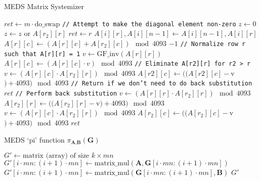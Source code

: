 \begin{algorithm}
  \caption{MEDS Matrix Systemizer}
  \label{alg:systemizer}
  \begin{algorithmic}
      \State $ret \gets m \cdot \text{do\_swap}$
        \State \texttt{// Attempt to make the diagonal element non-zero}
          \State $z \gets 0$
            \State $z \gets z$ or $A[r_2][r]$
          \EndFor
            \State $ret \gets r$
              \State $A[i][r], A[i][n-1] \gets A[i][n-1], A[i][r]$
            \EndFor
          \EndIf
        \EndIf
              \State $A[r][c] \gets (A[r][c] + A[r_2][c]) \mod 4093$
            \EndFor
          \EndIf
        \EndFor
          \State \Return $-1$
        \EndIf
        \State \texttt{// Normalize row r such that A[r][r] = 1}
        \State $v \gets \text{GF\_inv}(A[r][r])$
          \State $A[r][c] \gets (A[r][c] \cdot v) \mod 4093$
        \EndFor
        \State \texttt{// Eliminate A[r2][r] for r2 > r}
            \State $v \gets (A[r][c] \cdot A[r_2][r]) \mod 4093$
            \State $A[r2][c] \gets ((A[r2][c] - $v$) + 4093) \mod 4093$
          \EndFor
        \EndFor
      \EndFor
      \State \texttt{// Return if we don't need to do back substitution}
        \State \Return $ret$
      \EndIf
      \State \texttt{// Perform back substitution}
          \State $v \gets (A[r][r] \cdot A[r_2][r]) \mod 4093$
          \State $A[r_2][r] \gets ((A[r_2][r] - $v$) + 4093) \mod 4093$
            \State $v \gets (A[r][c] \cdot A[r_2][r]) \mod 4093$
            \State $A[r_2][c] \gets ((A[r_2][c] - $v$) + 4093) \mod 4093$
          \EndFor
        \EndFor
      \EndFor
      \State \Return $ret$
    \EndFunction
  \end{algorithmic}
\end{algorithm}

\begin{algorithm}
  \caption{MEDS `pi' function $\pi_{\textbf{A}, \textbf{B}}(\textbf{G})$}
  \label{alg:medspifunction}
  \begin{algorithmic}
      \State $G' \gets \text{matrix (array) of size } k \times mn$
        \State $G'[i \cdot mn:(i+1) \cdot mn] \gets \text{matrix\_mul}(\textbf{A}, \textbf{G}[i \cdot mn:(i+1) \cdot mn])$
        \State $G'[i \cdot mn:(i+1) \cdot mn] \gets \text{matrix\_mul}(\textbf{G}[i \cdot mn:(i+1) \cdot mn], \textbf{B})$
      \EndFor
      \State \Return $G'$
    \EndFunction
  \end{algorithmic}
\end{algorithm}

